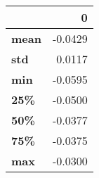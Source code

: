 \begin{tabular}{lr}
\toprule
{} &       0 \\
\midrule
\textbf{mean} & -0.0429 \\
\textbf{std } &  0.0117 \\
\textbf{min } & -0.0595 \\
\textbf{25\% } & -0.0500 \\
\textbf{50\% } & -0.0377 \\
\textbf{75\% } & -0.0375 \\
\textbf{max } & -0.0300 \\
\bottomrule
\end{tabular}
